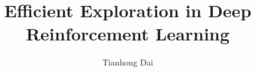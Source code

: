 \documentclass[a4paper,12pt,twoside]{report}
\begin{document}
\title{\LARGE {\bf Efficient Exploration in Deep Reinforcement Learning}\\
 \vspace*{6mm}
}

\author{Tianhong Dai}

\normallinespacing
\maketitle

\preface





\body






\appendix




\end{document}
